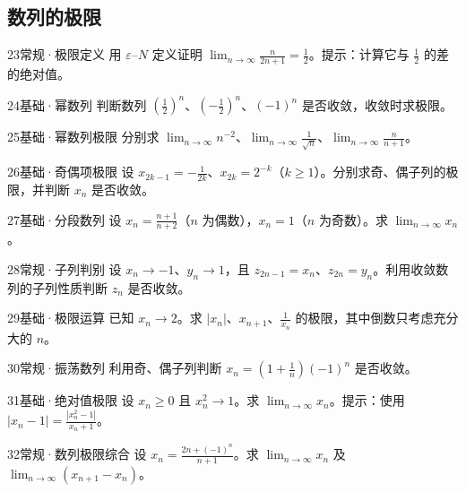\subsection{数列的极限}
\begin{exercise}{23}{常规·极限定义}
用 $\varepsilon$--$N$ 定义证明 $\lim_{n\to\infty}\frac{n}{2n+1}=\frac{1}{2}$。提示：计算它与 $\frac{1}{2}$ 的差的绝对值。
\end{exercise}
\begin{exercise}{24}{基础·幂数列}
判断数列 $(\frac{1}{2})^n$、$(-\frac{1}{2})^n$、$(-1)^n$ 是否收敛，收敛时求极限。
\end{exercise}
\begin{exercise}{25}{基础·幂数列极限}
分别求 $\lim_{n\to\infty}n^{-2}$、$\lim_{n\to\infty}\frac{1}{\sqrt n}$、$\lim_{n\to\infty}\frac{n}{n+1}$。
\end{exercise}
\begin{exercise}{26}{基础·奇偶项极限}
设 $x_{2k-1}=-\frac{1}{2k}$、$x_{2k}=2^{-k}$（$k\ge1$）。分别求奇、偶子列的极限，并判断 $x_n$ 是否收敛。
\end{exercise}
\begin{exercise}{27}{基础·分段数列}
设 $x_n=\frac{n+1}{n+2}$（$n$ 为偶数），$x_n=1$（$n$ 为奇数）。求 $\lim_{n\to\infty}x_n$。
\end{exercise}
\begin{exercise}{28}{常规·子列判别}
设 $x_n\to-1$、$y_n\to1$，且 $z_{2n-1}=x_n$、$z_{2n}=y_n$。利用收敛数列的子列性质判断 $z_n$ 是否收敛。
\end{exercise}
\begin{exercise}{29}{基础·极限运算}
已知 $x_n\to2$。求 $|x_n|$、$x_{n+1}$、$\frac{1}{x_n}$ 的极限，其中倒数只考虑充分大的 $n$。
\end{exercise}
\begin{exercise}{30}{常规·振荡数列}
利用奇、偶子列判断 $x_n=(1+\frac{1}{n})(-1)^n$ 是否收敛。
\end{exercise}
\begin{exercise}{31}{基础·绝对值极限}
设 $x_n\ge0$ 且 $x_n^2\to1$。求 $\lim_{n\to\infty}x_n$。提示：使用 $|x_n-1|=\frac{|x_n^2-1|}{x_n+1}$。
\end{exercise}
\begin{exercise}{32}{常规·数列极限综合}
设 $x_n=\frac{2n+(-1)^n}{n+1}$。求 $\lim_{n\to\infty}x_n$ 及 $\lim_{n\to\infty}(x_{n+1}-x_n)$。
\end{exercise}
